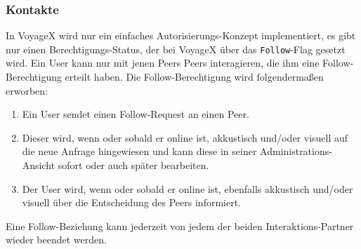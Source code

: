 \subsubsection{Kontakte}
In VoyageX wird nur ein einfaches Autorisierungs-Konzept implementiert, es gibt nur einen Berechtigungs-Status, der bei VoyageX über das \texttt{Follow}-Flag gesetzt wird. Ein User kann nur mit jenen Peers Peers interagieren, die ihm eine Follow-Berechtigung erteilt haben. Die Follow-Berechtigung wird folgendermaßen erworben:
\begin{enumerate}[leftmargin=*,noitemsep,topsep=1ex,parsep=0pt,partopsep=0pt]
\item Ein User sendet einen Follow-Request an einen Peer. 
\item Dieser wird, wenn oder sobald er online ist, akkustisch und/oder visuell auf die neue Anfrage hingewiesen und kann diese in seiner Administrations-Ansicht sofort oder auch später bearbeiten.
\item Der User wird, wenn oder sobald er online ist, ebenfalls akkustisch und/oder visuell über die Entscheidung des Peers informiert. 
\end{enumerate}
Eine Follow-Beziehung kann jederzeit von jedem der beiden Interaktions-Partner wieder beendet werden.

